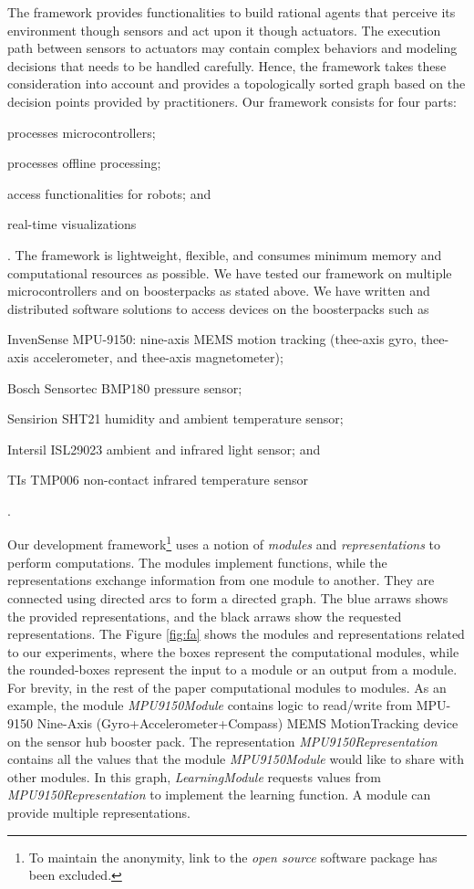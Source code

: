 \documentclass[letterpaper]{article}
\begin{document}
The framework provides functionalities to 
build  rational agents that perceive its environment though sensors and act upon it though 
actuators. The execution path between sensors to actuators may contain complex behaviors and 
modeling decisions that needs to be handled carefully. Hence, the framework takes these 
consideration into account and provides a topologically sorted graph based on the decision points 
provided by practitioners. Our framework consists for four parts: \begin{inparaenum}[(1)]\item 
processes microcontrollers; \item processes offline processing; \item access functionalities for  
robots; and \item real-time visualizations\end{inparaenum}. The 
framework is lightweight, flexible, and consumes minimum memory and computational resources as 
possible. We have tested our framework on multiple microcontrollers and on boosterpacks as stated 
above. We have written and distributed  software solutions to access devices on the boosterpacks 
such 
as \begin{inparaenum}[(1)] \item InvenSense MPU-9150: nine-axis MEMS motion tracking (thee-axis 
gyro, thee-axis accelerometer, and thee-axis magnetometer); \item Bosch Sensortec BMP180 pressure 
sensor; \item Sensirion SHT21 humidity and ambient temperature sensor; \item Intersil ISL29023 
ambient and infrared light sensor; and \item TIs TMP006 non-contact infrared temperature 
sensor\end{inparaenum}.


Our development framework\footnote{To maintain the anonymity, link to the {\em open source} 
software package has been excluded.} uses a 
notion of 
{\em modules} and {\em representations} to perform
computations. The modules implement functions, while the representations exchange information from
one module to another. They are connected using directed arcs to form a directed graph. The blue 
arraws shows the provided representations, 
and the black arraws show the requested representations. The Figure 
\ref{fig:fa} shows the modules and representations related to our 
experiments, where the boxes represent the computational modules, while the rounded-boxes represent 
the input to a module or an output from a module. For brevity, in the rest of the paper 
computational modules to modules. As an example, the module {\em MPU9150Module} contains logic to 
read/write from MPU-9150 Nine-Axis (Gyro+Accelerometer+Compass) MEMS MotionTracking device on the 
sensor hub booster pack. The representation {\em MPU9150Representation} contains all the values that 
the module {\em MPU9150Module} would like to share with other modules. In this graph, {\em 
LearningModule} requests values from {\em MPU9150Representation} to implement the learning function. 
A module can provide multiple representations.  
\end{document}
